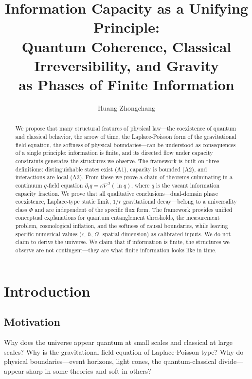 \documentclass[12pt]{article}
\begin{document}
\title{Information Capacity as a Unifying Principle:\\
Quantum Coherence, Classical Irreversibility, and Gravity\\
as Phases of Finite Information}

\author{Huang Zhongchang}

\maketitle

\begin{abstract}
We propose that many structural features of physical law---the coexistence of quantum and classical behavior, the arrow of time, the Laplace-Poisson form of the gravitational field equation, the softness of physical boundaries---can be understood as consequences of a single principle: information is finite, and its directed flow under capacity constraints generates the structures we observe. The framework is built on three definitions: distinguishable states exist (A1), capacity is bounded (A2), and interactions are local (A3). From these we prove a chain of theorems culminating in a continuum $q$-field equation $\partial_t q = \kappa\nabla^2(\ln q)$, where $q$ is the vacant information capacity fraction. We prove that all qualitative conclusions---dual-domain phase coexistence, Laplace-type static limit, $1/r$ gravitational decay---belong to a universality class $\Phi$ and are independent of the specific flux form. The framework provides unified conceptual explanations for quantum entanglement thresholds, the measurement problem, cosmological inflation, and the softness of causal boundaries, while leaving specific numerical values ($c$, $\hbar$, $G$, spatial dimension) as calibrated inputs. We do not claim to derive the universe. We claim that if information is finite, the structures we observe are not contingent---they are what finite information looks like in time.
\end{abstract}

\section{Introduction}

\subsection{Motivation}

Why does the universe appear quantum at small scales and classical at large scales? Why is the gravitational field equation of Laplace-Poisson type? Why do physical boundaries---event horizons, light cones, the quantum-classical divide---appear sharp in some theories and soft in others?
\end{document}
